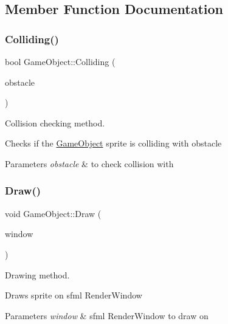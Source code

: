 \subsection{Member Function Documentation}
\mbox{\label{class_game_object_a9f63ba7fa09d165f175858276f71d44b}} 
\subsubsection{\texorpdfstring{Colliding()}{Colliding()}}
{\footnotesize\ttfamily bool Game\+Object\+::\+Colliding (\begin{DoxyParamCaption}\item[{\mbox{\hyperlink{class_game_object}{Game\+Object}} $\ast$}]{obstacle }\end{DoxyParamCaption})}



Collision checking method. 

Checks if the \mbox{\hyperlink{class_game_object}{Game\+Object}} sprite is colliding with obstacle 
\begin{DoxyParams}{Parameters}
{\em obstacle} & to check collision with \\
\hline
\end{DoxyParams}
\mbox{\label{class_game_object_a7ba982dd7315ab822c18dd9892112316}} 
\subsubsection{\texorpdfstring{Draw()}{Draw()}}
{\footnotesize\ttfamily void Game\+Object\+::\+Draw (\begin{DoxyParamCaption}\item[{sf\+::\+Render\+Window $\ast$}]{window }\end{DoxyParamCaption})}



Drawing method. 

Draws sprite on sfml Render\+Window 
\begin{DoxyParams}{Parameters}
{\em window} & sfml Render\+Window to draw on \\
\hline
\end{DoxyParams}
\mbox{\label{class_game_object_a274bf74e1658d845a0603be2972a63c4}} 
